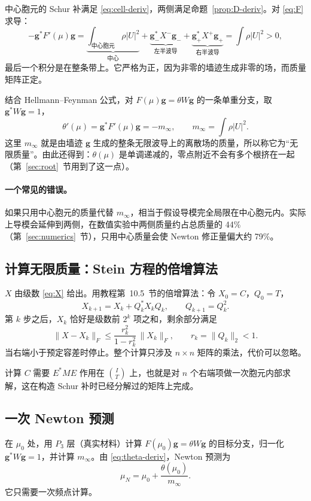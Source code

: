 \documentclass[11pt,a4paper,fontset=fandol]{ctexart}
\begin{document}
中心胞元的 Schur 补满足 \eqref{eq:cell-deriv}，两侧满足命题~\ref{prop:D-deriv}。对 \eqref{eq:F} 求导：
\begin{equation}
\label{eq:F-deriv}
-\bm g^*F'(\mu)\bm g=\underbrace{\int_{\text{中心胞元}}\rho|U|^2}_{\text{中心}}+\underbrace{\bm g_-^*X^-\bm g_-}_{\text{左半波导}}+\underbrace{\bm g_+^*X^+\bm g_+}_{\text{右半波导}}=\int\rho|U|^2>0 ,
\end{equation}
最后一个积分是在整条带上。它严格为正，因为非零的墙迹生成非零的场，而质量矩阵正定。

结合 Hellmann--Feynman 公式，对 $F(\mu)\bm g=\theta W\bm g$ 的一条单重分支，取 $\bm g^*W\bm g=1$，
\begin{equation}
\label{eq:theta-deriv}
\theta'(\mu)=\bm g^*F'(\mu)\bm g=-m_\infty,\qquad m_\infty=\int\rho|U|^2 .
\end{equation}
这里 $m_\infty$ 就是由墙迹 $\bm g$ 生成的整条无限波导上的离散场的质量，所以称它为“无限质量”。由此还得到：$\theta(\mu)$ 是单调递减的，零点附近不会有多个根挤在一起（第~\ref{sec:root}~节用到了这一点）。

\paragraph{一个常见的错误。} 如果只用中心胞元的质量代替 $m_\infty$，相当于假设导模完全局限在中心胞元内。实际上导模会延伸到两侧，在数值实验中两侧质量约占总质量的 44\%（第~\ref{sec:numerics}~节），只用中心质量会使 Newton 修正量偏大约 79\%。

\subsection{计算无限质量：Stein 方程的倍增算法}

$X$ 由级数 \eqref{eq:X} 给出。用教程第~10.5~节的倍增算法：令 $X_0=C$，$Q_0=T$，
\[
X_{k+1}=X_k+Q_k^*X_kQ_k,\qquad Q_{k+1}=Q_k^2 .
\]
第 $k$ 步之后，$X_k$ 恰好是级数前 $2^k$ 项之和，剩余部分满足
\[
\|X-X_k\|_F\le\frac{r_k^2}{1-r_k^2}\,\|X_k\|_F,\qquad r_k=\|Q_k\|_2<1 .
\]
当右端小于预定容差时停止。整个计算只涉及 $n\times n$ 矩阵的乘法，代价可以忽略。

计算 $C$ 需要 $E^*ME$ 作用在 $\binom{I}{T}$ 上，也就是对 $n$ 个右端项做一次胞元内部求解，这在构造 Schur 补时已经分解过的矩阵上完成。

\subsection{一次 Newton 预测}

在 $\mu_0$ 处，用 $P_3$ 层（真实材料）计算 $F(\mu_0)\bm g=\theta W\bm g$ 的目标分支，归一化 $\bm g^*W\bm g=1$，并计算 $m_\infty$。由 \eqref{eq:theta-deriv}，Newton 预测为
\begin{equation}
\label{eq:newton}
\mu_N=\mu_0+\frac{\theta(\mu_0)}{m_\infty} .
\end{equation}
它只需要一次频点计算。
\end{document}
